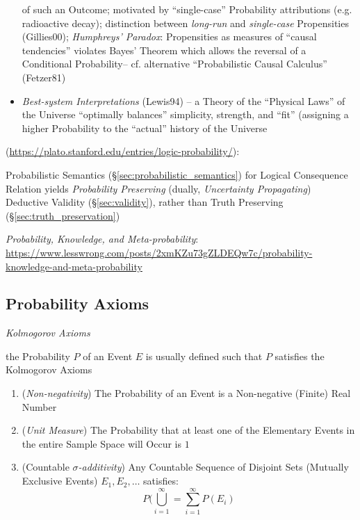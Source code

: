 \begin{itemize}
    of such an Outcome; motivated by ``single-case'' Probability attributions
    (e.g. radioactive decay); distinction between \emph{long-run} and
    \emph{single-case} Propensities (Gillies00); \emph{Humphreys' Paradox}:
    Propensities as measures of ``causal tendencies'' violates Bayes' Theorem
    which allows the reversal of a Conditional Probability-- cf. alternative
    ``Probabilistic Causal Calculus'' (Fetzer81)
  \item \emph{Best-system Interpretations} (Lewis94) -- a Theory of the
    ``Physical Laws'' of the Universe ``optimally balances'' simplicity,
    strength, and ``fit'' (assigning a higher Probability to the ``actual''
    history of the Universe
\end{itemize}

(\url{https://plato.stanford.edu/entries/logic-probability/}):

Probabilistic Semantics (\S\ref{sec:probabilistic_semantics}) for Logical
Consequence Relation yields \emph{Probability Preserving} (dually,
\emph{Uncertainty Propagating}) Deductive Validity (\S\ref{sec:validity}),
rather than Truth Preserving (\S\ref{sec:truth_preservation})

\emph{Probability, Knowledge, and Meta-probability}:
\url{https://www.lesswrong.com/posts/2xmKZu73gZLDEQw7c/probability-knowledge-and-meta-probability}



\subsection{Probability Axioms}\label{sec:probability_axioms}

\emph{Kolmogorov Axioms}

the Probability $P$ of an Event $E$ is usually defined such that $P$ satisfies
the Kolmogorov Axioms

\begin{enumerate}
  \item (\emph{Non-negativity}) The Probability of an Event is a Non-negative
    (Finite) Real Number
  \item (\emph{Unit Measure}) The Probability that at least one of the
    Elementary Events in the entire Sample Space will Occur is $1$
  \item (Countable \emph{$\sigma$-additivity}) Any Countable Sequence of
    Disjoint Sets (Mutually Exclusive Events) $E_1, E_2, \ldots$ satisfies:
    \[
      P (\bigcup_{i=1}^\infty = \sum_{i=1}^\infty P(E_i)
    \]
\end{enumerate}

